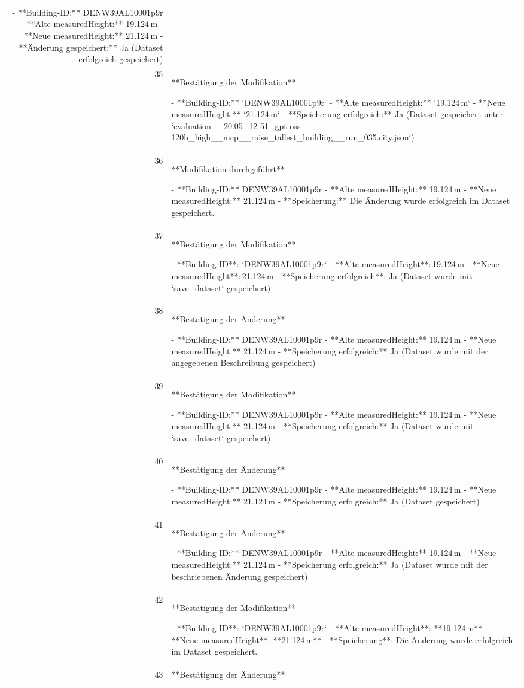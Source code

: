 \documentclass[a4paper,11pt]{article}
\begin{document}
\begin{table}[ht]
\begin{tabular}{r p{12cm}}
- **Building-ID:** DENW39AL10001p9r  
- **Alte measuredHeight:** 19.124 m  
- **Neue measuredHeight:** 21.124 m  
- **Änderung gespeichert:** Ja (Dataset erfolgreich gespeichert) \\
35 & **Bestätigung der Modifikation**

- **Building-ID:** `DENW39AL10001p9r`  
- **Alte measuredHeight:** `19.124 m`  
- **Neue measuredHeight:** `21.124 m`  
- **Speicherung erfolgreich:** Ja (Dataset gespeichert unter `evaluation\_\_20.05\_12-51\_gpt-oss-120b\_high\_\_mcp\_\_raise\_tallest\_building\_\_run\_035.city.json`) \\
36 & **Modifikation durchgeführt**

- **Building-ID:** DENW39AL10001p9r  
- **Alte measuredHeight:** 19.124 m  
- **Neue measuredHeight:** 21.124 m  
- **Speicherung:** Die Änderung wurde erfolgreich im Dataset gespeichert. \\
37 & **Bestätigung der Modifikation**

- **Building-ID**: `DENW39AL10001p9r`  
- **Alte measuredHeight**: 19.124 m  
- **Neue measuredHeight**: 21.124 m  
- **Speicherung erfolgreich**: Ja (Dataset wurde mit `save\_dataset` gespeichert) \\
38 & **Bestätigung der Änderung**

- **Building-ID:** DENW39AL10001p9r  
- **Alte measuredHeight:** 19.124 m  
- **Neue measuredHeight:** 21.124 m  
- **Speicherung erfolgreich:** Ja (Dataset wurde mit der angegebenen Beschreibung gespeichert) \\
39 & **Bestätigung der Modifikation**

- **Building-ID:** DENW39AL10001p9r  
- **Alte measuredHeight:** 19.124 m  
- **Neue measuredHeight:** 21.124 m  
- **Speicherung erfolgreich:** Ja (Dataset wurde mit `save\_dataset` gespeichert) \\
40 & **Bestätigung der Änderung**

- **Building-ID:** DENW39AL10001p9r  
- **Alte measuredHeight:** 19.124 m  
- **Neue measuredHeight:** 21.124 m  
- **Speicherung erfolgreich:** Ja (Dataset gespeichert) \\
41 & **Bestätigung der Änderung**

- **Building-ID:** DENW39AL10001p9r  
- **Alte measuredHeight:** 19.124 m  
- **Neue measuredHeight:** 21.124 m  
- **Speicherung erfolgreich:** Ja (Dataset wurde mit der beschriebenen Änderung gespeichert) \\
42 & **Bestätigung der Modifikation**

- **Building-ID**: `DENW39AL10001p9r`  
- **Alte measuredHeight**: **19.124 m**  
- **Neue measuredHeight**: **21.124 m**  
- **Speicherung**: Die Änderung wurde erfolgreich im Dataset gespeichert. \\
43 & **Bestätigung der Änderung**


\end{tabular}
\end{table}
\end{document}
